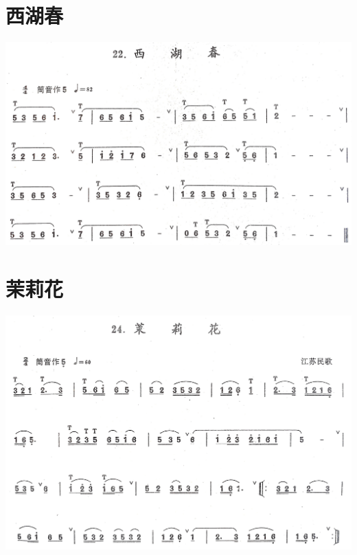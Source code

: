 \documentclass[cn,pad,chinesefont=nofont,twocol]{elegantbook}
\begin{document}
\section{西湖春}
    \includegraphics[width=\textwidth]{dongxiao/20200711-西湖春.jpg}
\section{茉莉花}
    \includegraphics[width=\textwidth]{dongxiao/20200711-茉莉花.jpg}
\end{document}
